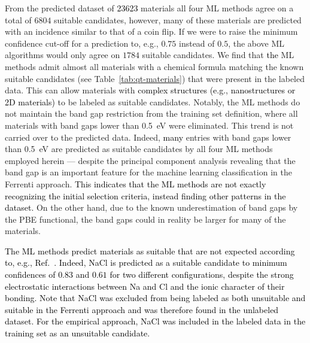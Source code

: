 \documentclass[superscriptaddress,unsortedaddress,
 amsmath,amssymb,
 aps,
]{revtex4-2}
\newcommand{\mrk}[1]{\textcolor{black}{#1}}
\begin{document}
From the predicted dataset of \mrk{\num{23623}} materials  
all four ML methods agree on a total of $6804$ suitable candidates, however, many of these materials are predicted with an incidence similar to that of a coin flip. If we were to raise the minimum confidence cut-off for a prediction to, e.g., $0.75$ instead of $0.5$, the above ML algorithms would only agree on $1784$ suitable candidates. 
We find that \mrk{the} ML methods admit almost all materials with a chemical formula matching the known suitable candidates (see Table~\ref{tab:qt-materials}) that were present in the labeled data. This can allow materials with \mrk{complex structures (e.g., nanostructures or 2D materials)} to be labeled as suitable candidates. Notably, the ML methods do not maintain the band gap restriction from the training set definition, where all materials with band gaps lower than \SI{0.5}{\electronvolt} were eliminated. 
This trend is not carried over to the predicted data. Indeed, \mrk{many} entries with band gaps lower than \SI{0.5}{\electronvolt} are predicted as suitable candidates by all four ML methods employed herein 
--- despite the principal component analysis revealing that the band gap is an important feature for the machine learning classification in the Ferrenti approach. \mrk{This indicates that the ML methods are not exactly recognizing the initial selection criteria, instead finding other patterns in the dataset.} 
On the other hand, due to the known  underestimation of band gaps by the PBE  functional, the band gaps could in reality be larger for many of the materials. 

\mrk{The ML methods predict materials as suitable that are not expected according to, e.g., Ref.~\cite{Weber2010}. Indeed, NaCl is predicted as a suitable candidate to minimum confidences of $0.83$ and $0.61$ for two different configurations, despite the strong electrostatic interactions between Na and Cl and the ionic character of their bonding. Note that NaCl was excluded from being labeled as both unsuitable and suitable in the Ferrenti approach and was therefore found in the unlabeled dataset. For the empirical approach, NaCl was included in the labeled data in the training set as an unsuitable candidate. }
\end{document}
